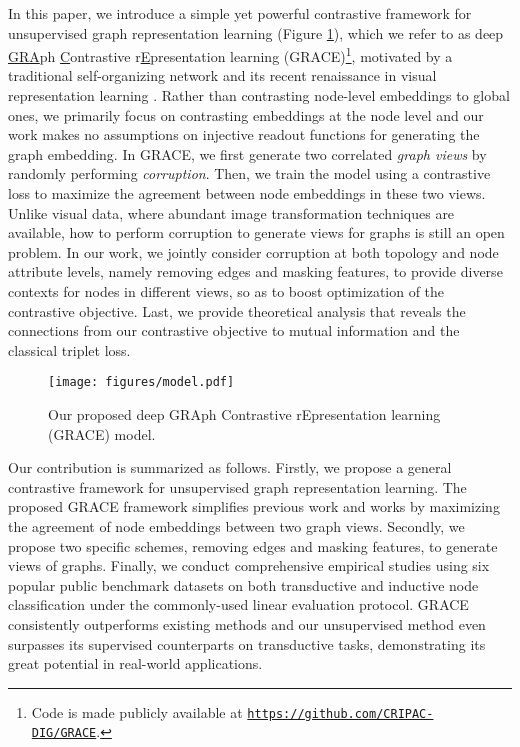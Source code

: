 \documentclass{article}
\theoremstyle{remark}
\begin{document}
In this paper, we introduce a simple yet powerful contrastive framework for unsupervised graph representation learning (Figure \ref{fig:model}), which we refer to as deep \underline{GRA}ph \underline{C}ontrastive r\underline{E}presentation learning (GRACE)\footnote{Code is made publicly available at \texttt{\url{https://github.com/CRIPAC-DIG/GRACE}}.}, motivated by a traditional self-organizing network \cite{Becker:1992ts} and its recent renaissance in visual representation learning \cite{Chen:2020wj}.
Rather than contrasting node-level embeddings to global ones, we primarily focus on contrasting embeddings at the node level and our work makes no assumptions on injective readout functions for generating the graph embedding.
In GRACE, we first generate two correlated \emph{graph views} by randomly performing \emph{corruption}. Then, we train the model using a contrastive loss to maximize the agreement between node embeddings in these two views.
Unlike visual data, where abundant image transformation techniques are available, how to perform corruption to generate views for graphs is still an open problem.
In our work, we jointly consider corruption at both topology and node attribute levels, namely removing edges and masking features, to provide diverse contexts for nodes in different views, so as to boost optimization of the contrastive objective.
Last, we provide theoretical analysis that reveals the connections from our contrastive objective to mutual information and the classical triplet loss.

\begin{figure}[t]
	\centering
	\texttt{[image: figures/model.pdf]}
	\caption{Our proposed deep GRAph Contrastive rEpresentation learning (GRACE) model.}
	\label{fig:model}
\end{figure}


Our contribution is summarized as follows.
Firstly, we propose a general contrastive framework for unsupervised graph representation learning. The proposed GRACE framework simplifies previous work and works by maximizing the agreement of node embeddings between two graph views.
Secondly, we propose two specific schemes, removing edges and masking features, to generate views of graphs.
Finally, we conduct comprehensive empirical studies using six popular public benchmark datasets on both transductive and inductive node classification under the commonly-used linear evaluation protocol. GRACE consistently outperforms existing methods
and our unsupervised method even surpasses its supervised counterparts on transductive tasks, demonstrating its great potential in real-world applications.
\end{document}
